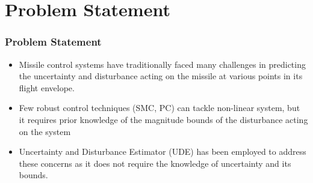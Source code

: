 \documentclass[table,10pt,red]{beamer}	%
\begin{document}
\section{Problem Statement} %
\begin{frame}
	\frametitle{Problem Statement}
 	\begin{itemize}  %
		\item Missile control systems have traditionally faced many challenges in predicting the uncertainty and disturbance acting on the missile at various points in its flight envelope. %
		\medskip
		\item Few robust control techniques (SMC, PC) can tackle non-linear system, but it requires prior knowledge of the magnitude bounds of the disturbance acting on the system %
		\medskip
		\item Uncertainty and Disturbance Estimator (UDE) has been employed to address these concerns as it does not require the knowledge of uncertainty and its bounds. %
	\end{itemize}
\end{frame}
\end{document}
